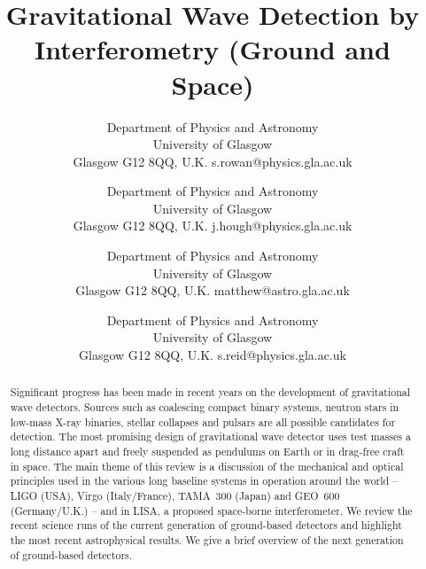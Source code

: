 \documentclass{article}
\begin{document}
\title{Gravitational Wave Detection by Interferometry (Ground and Space)}

\author{%
        {Department of Physics and Astronomy \\
        University of Glasgow \\
        Glasgow G12 8QQ, U.K.}
        {s.rowan@physics.gla.ac.uk}
	{}
\and
{}
        {Department of Physics and Astronomy \\
        University of Glasgow \\
        Glasgow G12 8QQ, U.K.}
        {j.hough@physics.gla.ac.uk}
	{}
\and
{}
        {Department of Physics and Astronomy \\
        University of Glasgow \\
        Glasgow G12 8QQ, U.K.}
        {matthew@astro.gla.ac.uk}
	{}
\and
{}
        {Department of Physics and Astronomy \\
        University of Glasgow \\
        Glasgow G12 8QQ, U.K.}
        {s.reid@physics.gla.ac.uk}
	{}
}

\date{}
\maketitle





\begin{abstract}
  Significant progress has been made in recent years on the development of
  gravitational wave detectors. Sources such as coalescing compact binary
  systems, neutron stars in low-mass X-ray binaries, stellar collapses and
  pulsars are all possible candidates for detection. The most promising design
  of gravitational wave detector uses test masses a long distance apart and
  freely suspended as pendulums on Earth or in drag-free craft in space.  The
  main theme of this review is a discussion of the mechanical and optical
  principles used in the various long baseline systems in operation around the
  world -- LIGO (USA), Virgo (Italy/France), TAMA~300 (Japan) and GEO~600
  (Germany/U.K.) -- and in LISA, a proposed space-borne interferometer. We
  review the recent science runs of the current generation of ground-based
  detectors and highlight the most recent astrophysical results. We give a
  brief overview of the next generation of ground-based detectors. 
\end{abstract}
\end{document}
